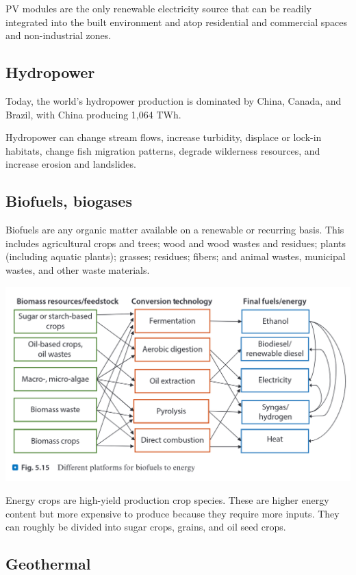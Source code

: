 PV modules are the only renewable electricity source that can be readily
integrated into the built environment and atop residential and commercial
spaces and non-industrial zones.

\subsection{Hydropower}

Today, the world’s hydropower production is dominated by China, Canada, and
Brazil, with China producing 1,064 TWh.

Hydropower can change stream flows, increase turbidity, displace or lock-in
habitats, change fish migration patterns, degrade wilderness resources, and
increase erosion and landslides.

\subsection{Biofuels, biogases}

Biofuels are any organic matter available on a renewable or recurring basis.
This includes agricultural crops and trees; wood and wood wastes and residues;
plants (including aquatic plants); grasses; residues; fibers; and animal
wastes, municipal wastes, and other waste materials.

\includegraphics[scale=0.75\linewidth]{content/img/biomass.png}

Energy crops are high-yield production crop species.
These are higher energy content but more expensive to produce because they
require more inputs. They can roughly be divided into sugar crops, grains, and
oil seed crops.

\subsection{Geothermal}
